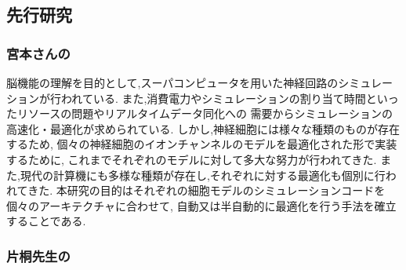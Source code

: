 \subsection{先行研究}
\subsubsection{宮本さんの}
脳機能の理解を目的として,スーパコンピュータを用いた神経回路のシミュレーションが行われている.
また,消費電力やシミュレーションの割り当て時間といったリソースの問題やリアルタイムデータ同化への
需要からシミュレーションの高速化・最適化が求められている.
しかし,神経細胞には様々な種類のものが存在するため,
個々の神経細胞のイオンチャンネルのモデルを最適化された形で実装するために,
これまでそれぞれのモデルに対して多大な努力が行われてきた.
また,現代の計算機にも多様な種類が存在し,それぞれに対する最適化も個別に行われてきた.
本研究の目的はそれぞれの細胞モデルのシミュレーションコードを個々のアーキテクチャに合わせて,
自動又は半自動的に最適化を行う手法を確立することである.

\subsubsection{片桐先生の}
